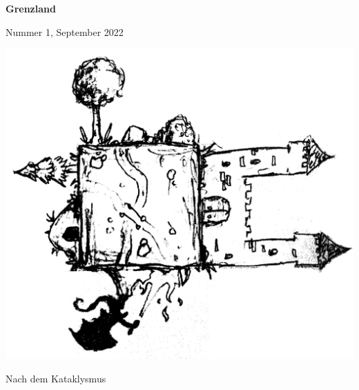 \documentclass[11pt]{wbzine}
\begin{document}
\begin{titlepage}
\centering
{\bfseries\fontsize{70}{55}\selectfont Grenzland}

\hrulefill Nummer 1, September 2022
    \vspace{1cm}

	  \includegraphics[width=\textwidth]{Coverimage.png}

    \vspace{1cm}
{\Huge Nach dem Kataklysmus\par}%

\end{titlepage}

    \setcounter{page}{2}
\tableofcontents
\end{document}
